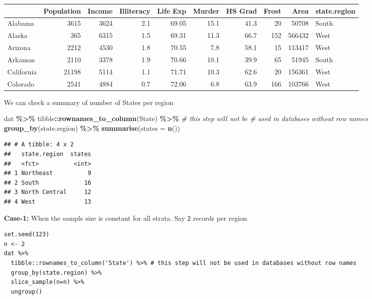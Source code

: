 \documentclass[
]{book}
\newenvironment{Shaded}{\begin{snugshade}}{\end{snugshade}}
\newcommand{\AttributeTok}[1]{\textcolor[rgb]{0.13,0.29,0.53}{#1}}
\newcommand{\CommentTok}[1]{\textcolor[rgb]{0.56,0.35,0.01}{\textit{#1}}}
\newcommand{\FunctionTok}[1]{\textcolor[rgb]{0.13,0.29,0.53}{\textbf{#1}}}
\newcommand{\NormalTok}[1]{#1}
\newcommand{\SpecialCharTok}[1]{\textcolor[rgb]{0.81,0.36,0.00}{\textbf{#1}}}
\newcommand{\StringTok}[1]{\textcolor[rgb]{0.31,0.60,0.02}{#1}}
\begin{document}
\begin{tabular}{l|r|r|r|r|r|r|r|r|l}
\hline
  & Population & Income & Illiteracy & Life Exp & Murder & HS Grad & Frost & Area & state.region\\
\hline
Alabama & 3615 & 3624 & 2.1 & 69.05 & 15.1 & 41.3 & 20 & 50708 & South\\
\hline
Alaska & 365 & 6315 & 1.5 & 69.31 & 11.3 & 66.7 & 152 & 566432 & West\\
\hline
Arizona & 2212 & 4530 & 1.8 & 70.55 & 7.8 & 58.1 & 15 & 113417 & West\\
\hline
Arkansas & 2110 & 3378 & 1.9 & 70.66 & 10.1 & 39.9 & 65 & 51945 & South\\
\hline
California & 21198 & 5114 & 1.1 & 71.71 & 10.3 & 62.6 & 20 & 156361 & West\\
\hline
Colorado & 2541 & 4884 & 0.7 & 72.06 & 6.8 & 63.9 & 166 & 103766 & West\\
\hline
\end{tabular}

We can check a summary of number of States per region

\begin{Shaded}
\begin{Highlighting}[]
\NormalTok{dat }\SpecialCharTok{\%\textgreater{}\%} 
\NormalTok{  tibble}\SpecialCharTok{::}\FunctionTok{rownames\_to\_column}\NormalTok{(}\StringTok{\textquotesingle{}State\textquotesingle{}}\NormalTok{) }\SpecialCharTok{\%\textgreater{}\%} \CommentTok{\# this step will not be }
                                  \CommentTok{\# used in databases without row names}
  \FunctionTok{group\_by}\NormalTok{(state.region) }\SpecialCharTok{\%\textgreater{}\%} 
  \FunctionTok{summarise}\NormalTok{(}\AttributeTok{states =} \FunctionTok{n}\NormalTok{())}
\end{Highlighting}
\end{Shaded}

\begin{verbatim}
## # A tibble: 4 x 2
##   state.region  states
##   <fct>          <int>
## 1 Northeast          9
## 2 South             16
## 3 North Central     12
## 4 West              13
\end{verbatim}

\textbf{Case-1:} When the sample size is constant for all strata. Say \texttt{2} records per region.

\begin{verbatim}
set.seed(123)
n <- 2
dat %>% 
  tibble::rownames_to_column('State') %>% # this step will not be used in databases without row names
  group_by(state.region) %>% 
  slice_sample(n=n) %>% 
  ungroup()
\end{verbatim}
\end{document}
